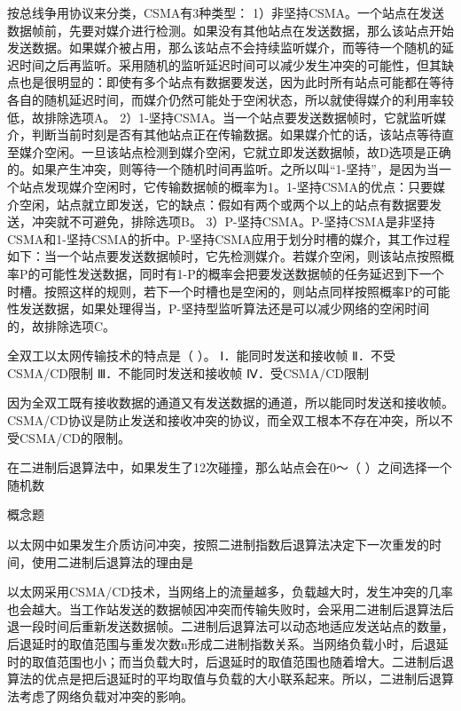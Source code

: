 \begin{solution}按总线争用协议来分类，CSMA有3种类型：
1）非坚持CSMA。一个站点在发送数据帧前，先要对媒介进行检测。如果没有其他站点在发送数据，那么该站点开始发送数据。如果媒介被占用，那么该站点不会持续监听媒介，而等待一个随机的延迟时间之后再监听。采用随机的监听延迟时间可以减少发生冲突的可能性，但其缺点也是很明显的：即使有多个站点有数据要发送，因为此时所有站点可能都在等待各自的随机延迟时间，而媒介仍然可能处于空闲状态，所以就使得媒介的利用率较低，故排除选项A。
2）1-坚持CSMA。当一个站点要发送数据帧时，它就监听媒介，判断当前时刻是否有其他站点正在传输数据。如果媒介忙的话，该站点等待直至媒介空闲。一旦该站点检测到媒介空闲，它就立即发送数据帧，故D选项是正确的。如果产生冲突，则等待一个随机时间再监听。之所以叫``1-坚持''，是因为当一个站点发现媒介空闲时，它传输数据帧的概率为1。1-坚持CSMA的优点：只要媒介空闲，站点就立即发送，它的缺点：假如有两个或两个以上的站点有数据要发送，冲突就不可避免，排除选项B。
3）P-坚持CSMA。P-坚持CSMA是非坚持CSMA和1-坚持CSMA的折中。P-坚持CSMA应用于划分时槽的媒介，其工作过程如下：当一个站点要发送数据帧时，它先检测媒介。若媒介空闲，则该站点按照概率P的可能性发送数据，同时有1-P的概率会把要发送数据帧的任务延迟到下一个时槽。按照这样的规则，若下一个时槽也是空闲的，则站点同样按照概率P的可能性发送数据，如果处理得当，P-坚持型监听算法还是可以减少网络的空闲时间的，故排除选项C。
\end{solution}
\question 全双工以太网传输技术的特点是（ ）。 Ⅰ．能同时发送和接收帧
Ⅱ．不受CSMA/CD限制 Ⅲ．不能同时发送和接收帧 Ⅳ．受CSMA/CD限制
\par{}
\begin{solution}因为全双工既有接收数据的通道又有发送数据的通道，所以能同时发送和接收帧。CSMA/CD协议是防止发送和接收冲突的协议，而全双工根本不存在冲突，所以不受CSMA/CD的限制。
\end{solution}
\question 在二进制后退算法中，如果发生了12次碰撞，那么站点会在0～（
）之间选择一个随机数
\par{}
\begin{solution}概念题
\end{solution}
\question 以太网中如果发生介质访问冲突，按照二进制指数后退算法决定下一次重发的时间，使用二进制后退算法的理由是
\par{}
\begin{solution}以太网采用CSMA/CD技术，当网络上的流量越多，负载越大时，发生冲突的几率也会越大。当工作站发送的数据帧因冲突而传输失败时，会采用二进制后退算法后退一段时间后重新发送数据帧。二进制后退算法可以动态地适应发送站点的数量，后退延时的取值范围与重发次数n形成二进制指数关系。当网络负载小时，后退延时的取值范围也小；而当负载大时，后退延时的取值范围也随着增大。二进制后退算法的优点是把后退延时的平均取值与负载的大小联系起来。所以，二进制后退算法考虑了网络负载对冲突的影响。
\end{solution}
